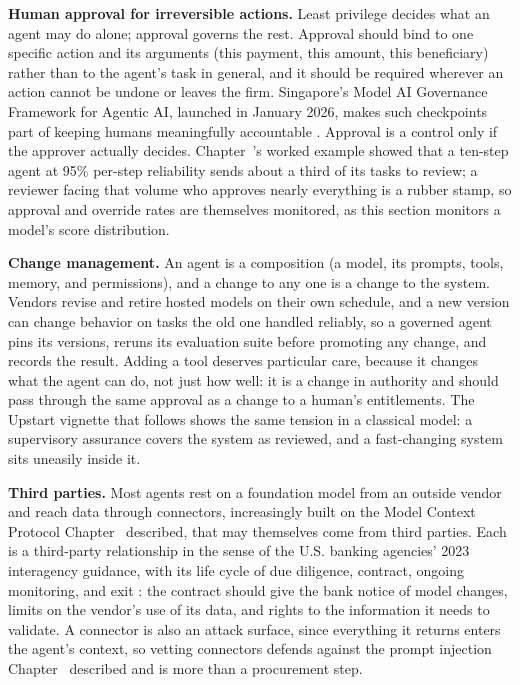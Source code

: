 \documentclass[../ai_in_finance]{subfiles}
\begin{document}
\textbf{Human approval for irreversible actions.} Least privilege decides what an agent may do alone; approval governs the rest. Approval should bind to one specific action and its arguments (this payment, this amount, this beneficiary) rather than to the agent's task in general, and it should be required wherever an action cannot be undone or leaves the firm. Singapore's Model AI Governance Framework for Agentic AI, launched in January 2026, makes such checkpoints part of keeping humans meaningfully accountable \parencite{imda2026agentic}. Approval is a control only if the approver actually decides. Chapter~'s worked example showed that a ten-step agent at 95\% per-step reliability sends about a third of its tasks to review; a reviewer facing that volume who approves nearly everything is a rubber stamp, so approval and override rates are themselves monitored, as this section monitors a model's score distribution.

\textbf{Change management.} An agent is a composition (a model, its prompts, tools, memory, and permissions), and a change to any one is a change to the system. Vendors revise and retire hosted models on their own schedule, and a new version can change behavior on tasks the old one handled reliably, so a governed agent pins its versions, reruns its evaluation suite before promoting any change, and records the result. Adding a tool deserves particular care, because it changes what the agent can do, not just how well: it is a change in authority and should pass through the same approval as a change to a human's entitlements. The Upstart vignette that follows shows the same tension in a classical model: a supervisory assurance covers the system as reviewed, and a fast-changing system sits uneasily inside it.

\textbf{Third parties.} Most agents rest on a foundation model from an outside vendor and reach data through connectors, increasingly built on the Model Context Protocol Chapter~ described, that may themselves come from third parties. Each is a third-party relationship in the sense of the U.S. banking agencies' 2023 interagency guidance, with its life cycle of due diligence, contract, ongoing monitoring, and exit \parencite{frb2023thirdparty}: the contract should give the bank notice of model changes, limits on the vendor's use of its data, and rights to the information it needs to validate. A connector is also an attack surface, since everything it returns enters the agent's context, so vetting connectors defends against the prompt injection Chapter~ described and is more than a procurement step.
\end{document}
